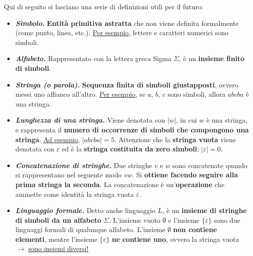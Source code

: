 \documentclass[a4paper]{article}
\begin{document}
	Qui di seguito si lasciano una serie di definizioni utili per il futuro:
	
	\begin{itemize}
		\item[\ding{42}] \textcolor{Red3}{\textbf{\emph{Simbolo.}}} \textbf{Entità primitiva astratta} che non viene definita formalmente (come punto, linea, etc.).\newline
		\underline{Per esempio}, lettere e caratteri numerici sono simboli.
		
		\item[\ding{42}] \textcolor{Red3}{\textbf{\emph{Alfabeto.}}} Rappresentato con la lettera greca Sigma $\Sigma$, è un \textbf{insieme finito di simboli}.
		
		\item[\ding{42}] \textcolor{Red3}{\textbf{\emph{Stringa (o parola).}}} \textbf{Sequenza finita di simboli giustapposti}, ovvero messi uno affianco all'altro.\newline
		\underline{Per esempio}, se $a$, $b$, $c$ sono simboli, allora $abcba$ è una stringa.
		
		\item[\ding{42}] \textcolor{Red3}{\textbf{\emph{Lunghezza di una stringa.}}} Viene denotata con $|w|$, in cui $w$ è una stringa, e rappresenta il \textbf{numero di occorrenze di simboli che compongono una stringa}. \underline{Ad esempio}, $|abcba| = 5$.\newline
		Attenzione che la \textcolor{Red3}{\textbf{stringa vuota}} viene denotata con $\varepsilon$ ed è la \textbf{stringa costituita da zero simboli}: $|\varepsilon| = 0$.
		
		\item[\ding{42}] \textcolor{Red3}{\textbf{\emph{Concatenazione di stringhe.}}} Due stringhe $v$ e $w$ sono concatenate quando si rappresentano nel seguente modo $vw$. Si \textbf{ottiene facendo seguire alla prima stringa la seconda}.\newline
		La concatenazione è un'\textbf{operazione} che ammette come identità la stringa vuota $\varepsilon$.
		
		\item[\ding{42}] \textcolor{Red3}{\textbf{\emph{Linguaggio formale.}}} Detto anche linguaggio $L$, è un \textbf{insieme di stringhe di simboli da un alfabeto} $\Sigma$. L'insieme vuoto $\emptyset$ e l'insieme $\{\varepsilon\}$ sono due linguaggi formali di qualunque alfabeto. L'insieme $\emptyset$ \textbf{non contiene elementi}, mentre l'insieme $\{\varepsilon\}$ \textbf{ne contiene uno}, ovvero la stringa vuota $\longrightarrow$ \underline{sono insiemi diversi!}
		

\end{itemize}
\end{document}
